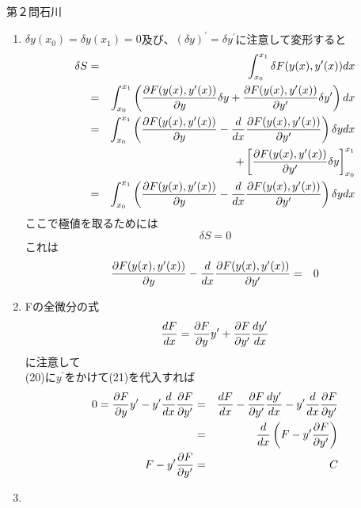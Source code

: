 \begin{answer}{第２問}{石川}
\begin{enumerate}
\item 
  $\delta y(x_0)=\delta y(x_1)=0$及び、$(\delta y)^{\prime}=\delta y^{\prime}$に注意して変形すると
  \begin{eqnarray}
  \delta S &=& \int_{x_0}^{x_1}\delta F(y(x),y^{\prime}(x))dx\\
  &=& \int_{x_0}^{x_1} \left( \frac{\partial F(y(x),y^{\prime}(x))}{\partial y}\delta y + \frac{\partial F(y(x),y^{\prime}(x))}{\partial y^{\prime}}\delta y^{\prime}\right) dx\\
  &=& \int_{x_0}^{x_1} \left( \frac{\partial F(y(x),y^{\prime}(x))}{\partial y} - \frac{d}{dx}\frac{\partial F(y(x),y^{\prime}(x))}{\partial y^{\prime}}\right)\delta y dx \\
  &&+ \left[\frac{\partial F(y(x),y^{\prime}(x))}{\partial y^{\prime}}\delta y\right]_{x_0}^{x_1}\\
  &=& \int_{x_0}^{x_1} \left( \frac{\partial F(y(x),y^{\prime}(x))}{\partial y} - \frac{d}{dx}\frac{\partial F(y(x),y^{\prime}(x))}{\partial y^{\prime}}\right)\delta y dx
  \end{eqnarray}
  ここで極値を取るためには\\
  \begin{equation}
  \delta S = 0
  \end{equation}
  これは\\
  \begin{eqnarray}
  \frac{\partial F(y(x),y^{\prime}(x))}{\partial y} - \frac{d}{dx}\frac{\partial F(y(x),y^{\prime}(x))}{\partial y^{\prime}} &=& 0
  \end{eqnarray}
\item 
  Fの全微分の式\\
  \begin{eqnarray}
  \frac{dF}{dx} = \frac{\partial F}{\partial y}y^{\prime} + \frac{\partial F}{\partial y^{\prime}}\frac{dy^{\prime}}{dx}
  \end{eqnarray}
  に注意して\\
  (20)に$y^{\prime}$をかけて(21)を代入すれば\\
  \begin{eqnarray}
  0=\frac{\partial F}{\partial y}y^{\prime}-y^{\prime}\frac{d}{dx}\frac{\partial F}{\partial y^{\prime}} &=& \frac{dF}{dx} - \frac{\partial F}{\partial y^{\prime}}\frac{dy^{\prime}}{dx}-y^{\prime}\frac{d}{dx}\frac{\partial F}{\partial y^{\prime}}\\
  &=& \frac{d}{dx}\left(F-y^{\prime}\frac{\partial F}{\partial y^{\prime}} \right)\\
  F-y^{\prime}\frac{\partial F}{\partial y^{\prime}} &=& C
  \end{eqnarray}
\item 
  \begin{eqnarray}

\end{eqnarray}
\end{enumerate}
\end{answer}
